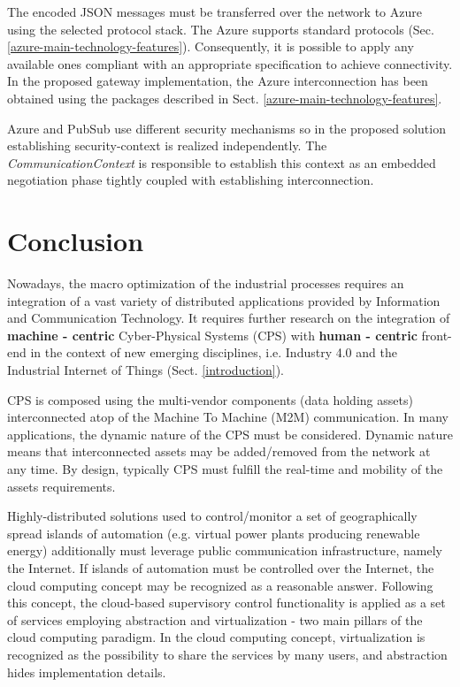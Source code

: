 \documentclass{article}
\begin{document}
The encoded JSON messages must be transferred over the network to Azure using the selected protocol stack. The Azure supports standard protocols (Sec. \ref{azure-main-technology-features}). Consequently, it is possible to apply any available ones compliant with an appropriate specification to achieve connectivity. In the proposed gateway implementation, the Azure interconnection has been obtained using the packages described in Sect. \ref{azure-main-technology-features}.

Azure and PubSub use different security mechanisms so in the proposed solution establishing security-context is realized independently. The \emph{CommunicationContext} is responsible to establish this context as an embedded negotiation phase tightly coupled with establishing interconnection.

\section{Conclusion}\label{section.conclusion}

Nowadays, the macro optimization of the industrial processes requires an integration of a vast variety of distributed applications provided by Information and Communication Technology. It requires further research on the integration of \textbf{machine - centric} Cyber-Physical Systems (CPS) with \textbf{human - centric} front-end in the context of new emerging disciplines, i.e. Industry 4.0 and the Industrial Internet of Things (Sect. \ref{introduction}).

CPS is composed using the multi-vendor components (data holding assets) interconnected atop of the Machine To Machine (M2M) communication. In many applications, the dynamic nature of the CPS must be considered. Dynamic nature means that interconnected assets may be added/removed from the network at any time. By design, typically CPS must fulfill the real-time and mobility of the assets requirements.

Highly-distributed solutions used to control/monitor a set of geographically spread islands of automation (e.g. virtual power plants producing renewable energy) additionally must leverage public communication infrastructure, namely the Internet. If islands of automation must be controlled over the Internet, the cloud computing concept may be recognized as a reasonable answer. Following this concept, the cloud-based supervisory control functionality is applied as a set of services employing abstraction and virtualization - two main pillars of the cloud computing paradigm. In the cloud computing concept, virtualization is recognized as the possibility to share the services by many users, and abstraction hides implementation details.
\end{document}
